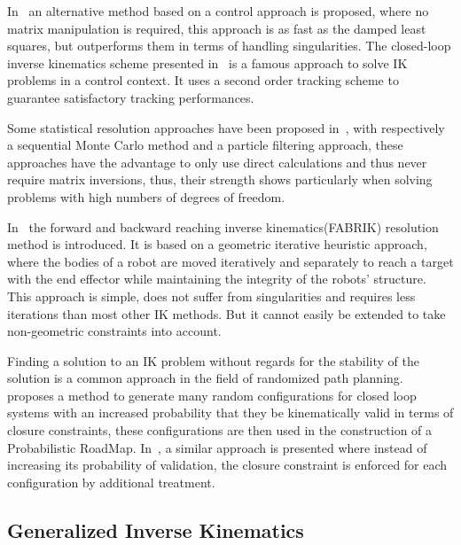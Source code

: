 In~\cite{pechev2008inverse} an alternative method based on a control approach is proposed, where no matrix manipulation is required, this approach is as fast as the damped least squares, but outperforms them in terms of handling singularities.
The closed-loop inverse kinematics scheme presented in~\cite{siciliano1990closed} is a famous approach to solve IK problems in a control context.
It uses a second order tracking scheme to guarantee satisfactory tracking performances.

Some statistical resolution approaches have been proposed in~\cite{courty2008inverse, hecker2008real}, with respectively a sequential Monte Carlo method and a particle filtering approach, these approaches have the advantage to only use direct calculations and thus never require matrix inversions, thus, their strength shows particularly when solving problems with high numbers of degrees of freedom.

In~\cite{AristidouFABRIK, Aristidou:2016_ExtFABRIK} the forward and backward reaching inverse kinematics(FABRIK) resolution method is introduced.
It is based on a geometric iterative heuristic approach, where the bodies of a robot are moved iteratively and separately to reach a target with the end effector while maintaining the integrity of the robots' structure.
This approach is simple, does not suffer from singularities and requires less iterations than most other IK methods.
But it cannot easily be extended to take non-geometric constraints into account.

Finding a solution to an IK problem without regards for the stability of the solution is a common approach in the field of randomized path planning.
\cite{cortes2002random} proposes a method to generate many random configurations for closed loop systems with an increased probability that they be kinematically valid in terms of closure constraints, these configurations are then used in the construction of a Probabilistic RoadMap. In~\cite{lavalle1999probabilistic}, a similar approach is presented where instead of increasing its probability of validation, the closure constraint is enforced for each configuration by additional treatment.

\subsection{Generalized Inverse Kinematics}
\label{sub:generalized_inverse_kinematics}

